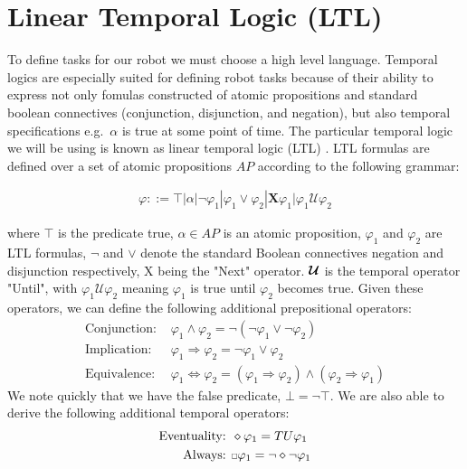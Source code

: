 \section{Linear Temporal Logic (LTL)}
To define tasks for our robot we must choose a high level language. Temporal logics are especially suited for defining robot tasks because of their ability to express not only fomulas constructed of atomic propositions and standard boolean connectives (conjunction, disjunction, and negation), but also temporal specifications e.g.\ $\alpha$ is true at some point of time. The particular temporal logic we will be using is known as linear temporal logic (LTL) \cite{clarke99}. LTL formulas are defined over a set of atomic propositions $AP$ according to the following grammar:

\begin{align*}
    \varphi ::= \top | \alpha | \neg \varphi_1 | \varphi_1  \lor \varphi_2 | \textbf{X} \varphi_1 | \varphi_1 \bm{\mathcal{U}} \varphi_2
\end{align*}

where $\top$ is the predicate true, $\alpha \in AP$ is an atomic proposition, $\varphi_1$ and $\varphi_2$ are LTL formulas, $\neg$ and $\lor$ denote the standard Boolean connectives negation and disjunction respectively, X being the "Next" operator. $\bm{\mathcal{U}}$ is the temporal operator "Until", with $\varphi_1 \mathcal{U} \varphi_2$ meaning $\varphi_1$ is true until $\varphi_2$ becomes true. Given these operators, we can define the following additional prepositional operators:
\begin{align*}
    \text{Conjunction: }&  \varphi_1  \land \varphi_2 = \neg(\neg \varphi_1 \lor \neg \varphi_2) \\
    \text{Implication: }& \varphi_1 \Rightarrow \varphi_2 = \neg \varphi_1 \lor \varphi_2 \\
    \text{Equivalence: }& \varphi_1 \Leftrightarrow \varphi_2 = (\varphi_1 \Rightarrow \varphi_2) \land (\varphi_2 \Rightarrow \varphi_1)
\end{align*}
We note quickly that we have the false predicate, $\bot = \neg \top$.
We are also able to derive the following additional temporal operators:
\begin{align*}
    \text{Eventuality: }& \diamond \varphi_1 = T U \varphi_1 \\
    \text{Always: }& \ssquare \varphi_1 = \neg \diamond \neg \varphi_1
\end{align*}

